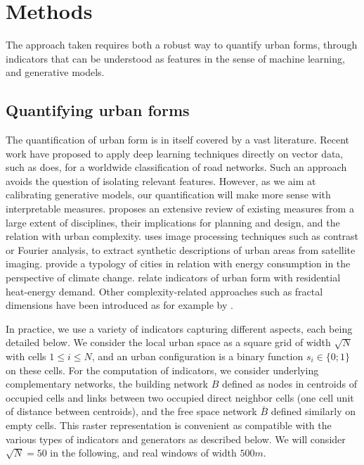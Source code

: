 \documentclass[letterpaper]{article}
\begin{document}
\section{Methods} \label{sec:methods}

The approach taken requires both a robust way to quantify urban forms, through indicators that can be understood as features in the sense of machine learning, and generative models.

\subsection{Quantifying urban forms}

The quantification of urban form is in itself covered by a vast literature.
Recent work have proposed to apply deep learning techniques directly on vector data, such as \cite{2017arXiv170902939M} does, for a worldwide classification of road networks. Such an approach avoids the question of isolating relevant features.
However, as we aim at calibrating generative models, our quantification will make more sense with interpretable measures.
\cite{boeing2018measuring} proposes an extensive review of existing measures from a large extent of disciplines, their implications for planning and design, and the relation with urban complexity. \cite{webster1995urban} uses image processing techniques such as contrast or Fourier analysis, to extract synthetic descriptions of urban areas from satellite imaging. \cite{fumega2014identification} provide a typology of cities in relation with energy consumption in the perspective of climate change. \cite{rode2014cities} relate indicators of urban form with residential heat-energy demand. Other complexity-related approaches such as fractal dimensions have been introduced as for example by \cite{batty1987fractal}.



In practice, we use a variety of indicators capturing different aspects, each being detailed below. We consider the local urban space as a square grid of width $\sqrt{N}$ with cells $1 \leq i \leq N$, and an urban configuration is a binary function $s_i \in \{0;1\}$ on these cells. For the computation of indicators, we consider underlying complementary networks, the building network $B$ defined as nodes in centroids of occupied cells and links between two occupied direct neighbor cells (one cell unit of distance between centroids), and the free space network $\bar{B}$ defined similarly on empty cells. This raster representation is convenient as compatible with the various types of indicators and generators as described below. We will consider $\sqrt{N}=50$ in the following, and real windows of width $500m$.
\end{document}
